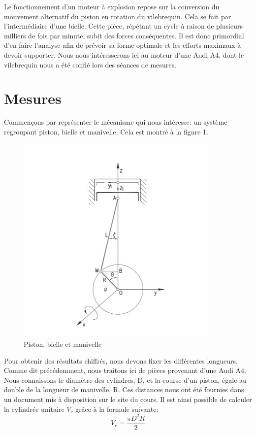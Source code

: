 \documentclass[a4paper,oneside,12pt]{report}
\begin{document}
Le fonctionnement d'un moteur à explosion repose sur la conversion du mouvement alternatif du piston en rotation du vilebrequin. Cela se fait par l'intermédiaire d'une bielle. Cette pièce, répétant un cycle à raison de plusieurs milliers de fois par minute, subit des forces conséquentes. Il est donc primordial d'en faire l'analyse afin de prévoir sa forme optimale et les efforts maximaux à devoir supporter. Nous nous intéresserons ici au moteur d'une Audi A4, dont le vilebrequin nous a été confié lors des séances de mesures.

\section{Mesures}

Commençons par représenter le mécanisme qui nous intéresse: un système regroupant piston, bielle et manivelle. Cela est montré à la figure 1. \\

\begin{figure}	
	\center
	\includegraphics[scale=0.8]{Dessin.jpg}
	\caption{Piston, bielle et manivelle}
\end{figure}

Pour obtenir des résultats chiffrés, nous devons fixer les différentes longueurs. Comme dit précédemment, nous traitons ici de pièces provenant d'une Audi A4. Nous connaissons le diamètre des cylindres, D, et la course d'un piston, égale au double de la longueur de manivelle, R. Ces distances nous ont été fournies dans un document mis à disposition sur le site du cours. Il est ainsi possible de calculer la cylindrée unitaire $V_c$ grâce à la formule suivante: 
$$V_c =\frac{\pi D^2 R}{2}$$
\end{document}
